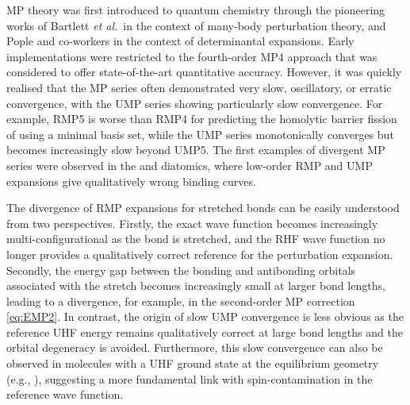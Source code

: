 \documentclass[aps,prb,reprint,noshowkeys,superscriptaddress]{revtex4-1}
\newcommand{\latin}[1]{#1}
\newcommand{\eg}{\latin{e.g.}}
\newcommand{\etal}{\textit{et al.}}
\begin{document}
MP theory was first introduced to quantum chemistry through the pioneering
works of Bartlett \etal\ in the context of many-body perturbation theory,\cite{Bartlett_1975}
and Pople and co-workers in the context of determinantal expansions.\cite{Pople_1976,Pople_1978}
Early implementations were restricted to the fourth-order MP4 approach that was considered
to offer state-of-the-art quantitative accuracy.\cite{Pople_1978,Krishnan_1980}
However, it was quickly realised that the MP series often demonstrated very slow, oscillatory, 
or erratic convergence, with the UMP series showing particularly slow convergence.\cite{Laidig_1985,Knowles_1985,Handy_1985}
For example, RMP5 is worse than RMP4 for predicting the homolytic barrier fission of  using a minimal basis set, 
while the UMP series monotonically converges but becomes increasingly slow beyond UMP5.\cite{Gill_1986}
The first examples of divergent MP series were observed in the  and  
diatomics, where low-order RMP and UMP expansions give qualitatively wrong binding curves.\cite{Laidig_1987} 

The divergence of RMP expansions for stretched bonds can be easily understood from two perspectives.\cite{Gill_1988a}
Firstly, the exact wave function becomes increasingly multi-configurational as the bond is stretched, and the 
RHF wave function no longer provides a qualitatively correct reference for the perturbation expansion.
Secondly, the energy gap between the bonding and antibonding orbitals associated with the stretch becomes
increasingly small at larger bond lengths, leading to a divergence, for example, in the second-order MP correction \eqref{eq:EMP2}.
In contrast, the origin of slow UMP convergence is less obvious as the reference UHF energy remains
qualitatively correct at large bond lengths and the orbital degeneracy is avoided.
Furthermore, this slow convergence can also be observed in molecules with a UHF ground state at the equilibrium
geometry (\eg, ), suggesting a more fundamental link with spin-contamination 
in the reference wave function.\cite{Nobes_1987}
\end{document}
